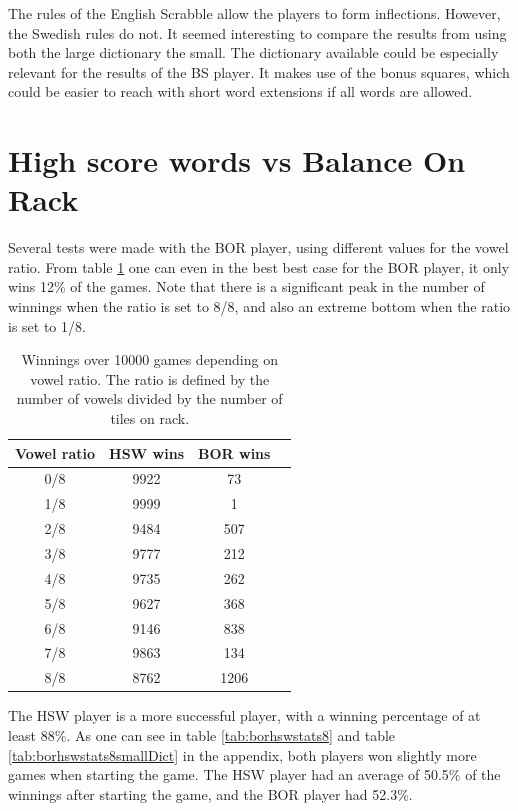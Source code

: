 \documentclass[a4paper, 12pt]{report}
\begin{document}
The rules of the English Scrabble allow the players to form inflections. However, the Swedish rules do not. It seemed interesting to compare the results from using both the large dictionary the small. The dictionary available could be especially relevant for the results of the BS player. It makes use of the bonus squares, which could be easier to reach with short word extensions if all words are allowed.


\section{High score words vs Balance On Rack}
\label{sec:highBalance}

Several tests were made with the BOR player, using different values for the vowel ratio. From table \ref{tab:bor+hsw} one can even in the best best case for the BOR player, it only wins 12\% of the games. Note that there is a significant peak in the number of winnings when the ratio is set to 8/8, and also an extreme bottom when the ratio is set to 1/8.


\begin{table}[h]
\centering
    \begin{tabular}{ c | c | c p{5cm}}
   	Vowel ratio & HSW wins & BOR wins \\ \hline
	0/8 & 9922 & 73 \\ 
    	1/8 & 9999  & 1 \\ 
    	2/8 & 9484 & 507 \\
    	3/8 & 9777 & 212 \\
	4/8 & 9735 & 262 \\ 
	5/8 & 9627 & 368 \\ 
	6/8 & 9146 & 838 \\ 
	7/8 & 9863 & 134 \\ 
	8/8 & 8762 & 1206 \\
    \end{tabular}
\caption{Winnings over 10000 games depending on vowel ratio. The ratio is defined by the number of vowels divided by the number of tiles on rack.}
\label{tab:bor+hsw}
\end{table}


The HSW player is a more successful player, with a winning percentage of at least 88\%. As one can see in table \ref{tab:borhswstats8} and table \ref{tab:borhswstats8smallDict} in the appendix, both players won slightly more games when starting the game. The HSW player had an average of 50.5\% of the winnings after starting the game, and the BOR player had 52.3\%. 
\end{document}
